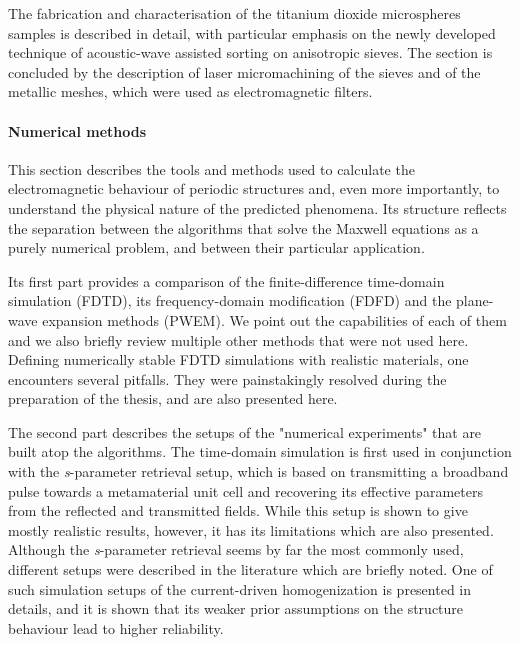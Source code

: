 The fabrication and characterisation of the titanium dioxide microspheres samples is described in detail, with particular emphasis on the newly developed technique of acoustic-wave assisted sorting on anisotropic sieves. The section is concluded by the description of laser micromachining of the sieves and of the metallic meshes, which were used as electromagnetic filters.

\paragraph{Numerical methods} %
This section describes the tools and methods used to calculate the electromagnetic behaviour of periodic structures and, even more importantly, to understand the physical nature of the predicted phenomena. Its structure reflects the separation between the algorithms that solve the Maxwell equations as a purely numerical problem, and between their particular application.

Its first part provides a comparison of the finite-difference time-domain simulation (FDTD), its frequency-domain modification (FDFD) 
and the plane-wave expansion methods (PWEM).
We point out the capabilities of each of them and we also briefly review multiple other methods that were not used here. %
Defining numerically stable FDTD simulations with realistic materials, one encounters several pitfalls. They were painstakingly resolved during the preparation of the thesis, and are also presented here.

The second part describes the setups of the "numerical experiments" that are built atop the algorithms. 
The time-domain simulation is first used in conjunction with the \textit{s}-parameter retrieval setup, which is based on transmitting a broadband pulse towards a metamaterial unit cell and recovering its effective parameters from the reflected and transmitted fields. While this setup is shown to give mostly realistic results, however, it has its limitations which are also presented. Although the \textit{s}-parameter retrieval seems by far the most commonly used, different setups were described in the literature which are briefly noted.
One of such simulation setups of the current-driven homogenization is presented in details, and it is shown that its weaker prior assumptions on the structure behaviour lead to higher reliability.

